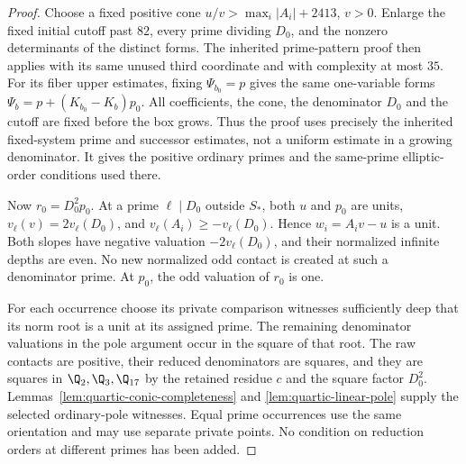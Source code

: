 \begin{proof}
Choose a fixed positive cone
$u/v>\max_i|A_i|+2413$, $v>0$. Enlarge the fixed initial cutoff past
$82$, every prime dividing $D_0$, and the nonzero determinants of the
distinct forms. The inherited prime-pattern proof then applies with its
same unused third coordinate and with complexity at most $35$.
For its fiber upper estimates, fixing $\Psi_{b_0}=p$ gives the same
one-variable forms
$\Psi_b=p+(K_{b_0}-K_b)p_0$.
All coefficients, the cone, the denominator $D_0$ and the cutoff are
fixed before the box grows. Thus the proof uses precisely the inherited
fixed-system prime and successor estimates, not a uniform estimate in a
growing denominator. It gives the positive ordinary primes and the
same-prime elliptic-order conditions used there.

Now $r_0=D_0^2p_0$. At a prime $\ell\mid D_0$ outside $S_*$, both $u$
and $p_0$ are units, $v_\ell(v)=2v_\ell(D_0)$, and
$v_\ell(A_i)\ge-v_\ell(D_0)$. Hence $w_i=A_iv-u$ is a unit.
Both slopes have negative valuation $-2v_\ell(D_0)$, and their normalized
infinite depths are even. No new normalized odd contact is created at
such a denominator prime. At $p_0$, the odd valuation of $r_0$ is one.

For each occurrence choose its private comparison witnesses sufficiently
deep that its norm root is a unit at its assigned prime. The remaining
denominator valuations in the pole argument occur in the square of that
root. The raw contacts are positive, their reduced denominators are
squares, and they are squares in $\Q_2,\Q_3,\Q_{17}$ by the retained
residue $c$ and the square factor $D_0^2$.
Lemmas~\ref{lem:quartic-conic-completeness} and
\ref{lem:quartic-linear-pole} supply the selected ordinary-pole witnesses. Equal prime occurrences use the
same orientation and may use separate private points. No condition on
reduction orders at different primes has been added.
\end{proof}

